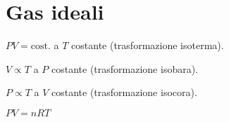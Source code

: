 \documentclass[letterpaper,10pt,english]{jupyterBook}
\begin{document}
\section{Gas ideali}
\label{\detokenize{ch/ideal_gases:gas-ideali}}\label{\detokenize{ch/ideal_gases:classical-thermodynamics-ideal-gases}}\label{\detokenize{ch/ideal_gases::doc}}
\sphinxAtStartPar
{} \(P V = \text{cost.}\) a \(T\) costante (trasformazione isoterma).

\sphinxAtStartPar
{} \(V \propto T\) a \(P\) costante (trasformazione isobara).

\sphinxAtStartPar
{} \(P \propto T\) a \(V\) costante (trasformazione isocora).

\sphinxAtStartPar
{} \(P V = n R T\)

\sphinxstepscope
\end{document}
